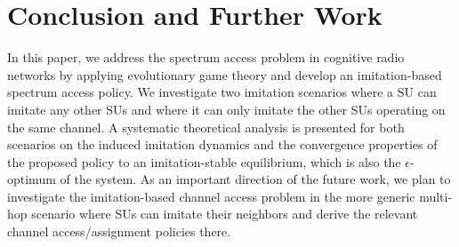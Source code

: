 \documentclass[12pt, onecolumn]{IEEEtran}
\theoremstyle{plain}
\theoremstyle{definition}
\begin{document}
\section{Conclusion and Further Work}
\label{sec:conclusion}

In this paper, we address the spectrum access problem in cognitive radio networks by applying evolutionary game theory and develop an imitation-based
spectrum access policy. We investigate two imitation scenarios where a SU can imitate any other SUs and where it can only imitate the other SUs operating
on the same channel. A systematic theoretical analysis is presented for both scenarios on the induced imitation
dynamics and the convergence properties of the proposed policy to an imitation-stable equilibrium, which is also the $\epsilon$-optimum of the system.
As an important direction of the future work, we plan to investigate the imitation-based channel access problem in the more generic multi-hop scenario where SUs can imitate their neighbors and derive the relevant channel access/assignment policies there.











\appendix
\end{document}
